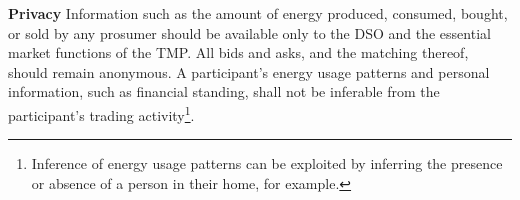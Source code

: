 \documentclass[sigplan]{acmart}
\newcommand{\Karla}[1]{\todo[color=green!50, linecolor=black!50]{\textbf{Karla}: #1}}
\begin{document}



\textbf{Privacy}
Information such as the amount of energy produced, consumed, bought, or sold by any prosumer should be available only to the DSO and the essential market functions of the TMP. All bids and asks, and the matching thereof, should remain anonymous. A participant's energy usage patterns and personal information, such as financial standing, shall not be inferable from the participant's trading activity\footnote{Inference of energy usage patterns can be exploited by inferring the presence or absence of a person in their home, for example.}.
\end{document}
